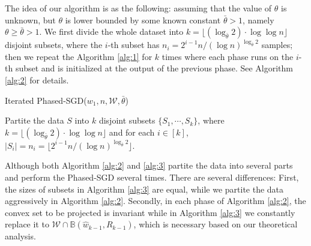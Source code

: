 \documentclass[12pt]{alt2022} %
\begin{document}
The idea of our algorithm is as the following: assuming that the value of $\theta$ is unknown, but $\theta$ is lower bounded by some known constant $\bar{\theta}>1$, namely $\theta\geq \bar{\theta}>1$. We first divide the whole dataset into $k=\lfloor (\log_{\bar{\theta}}2)\cdot \log\log n\rfloor$ disjoint subsets, where the $i$-th subset has $n_i=2^{i-1} n/(\log n)^{\log_{\bar{\theta}}2}$ samples;  then we repeat the Algorithm \ref{alg:1} for $k$ times where each phase runs on the $i$-th subset and is initialized at the output of the previous phase. See Algorithm \ref{alg:2} for details. 	\begin{algorithm}
	\caption{Iterated Phased-SGD($w_1, n,\mathcal{W}, \bar{\theta}$) \label{alg:2}}
	    Partite the data $S$ into $k$ disjoint subsets $\{S_1, \cdots, S_k\}$, where $k=\lfloor (\log_{\bar{\theta}}2)\cdot \log\log n\rfloor$ and for each $i\in [k]$, $|S_i|=n_i=\lfloor 2^{i-1} n/(\log n)^{\log_{\bar{\theta}}2}\rfloor$.\;
	    
\end{algorithm}
\begin{remark}
Although both Algorithm \ref{alg:2} and \ref{alg:3} partite the data into several parts and perform the Phased-SGD several times. There are several differences: First, the sizes of subsets in Algorithm \ref{alg:3} are equal, while we partite the data aggressively in Algorithm \ref{alg:2}. Secondly, in each phase of Algorithm \ref{alg:2}, the convex set to be projected is invariant while in Algorithm \ref{alg:3} we constantly replace it to $\mathcal{W}\cap \mathbb{B}(\hat{w}_{k-1},R_{k-1})$, which is necessary based on our theoretical analysis.  
\end{remark}
\end{document}
